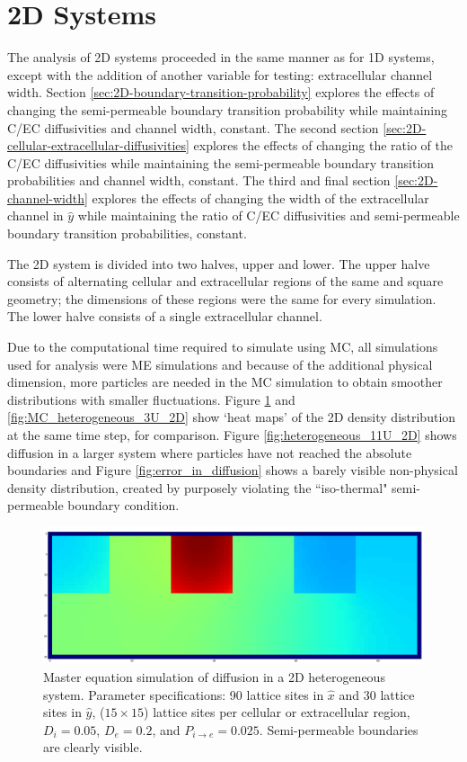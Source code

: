 \section{2D Systems}
\label{sec:ra-2D}
	The analysis of 2D systems proceeded in the same manner as for 1D systems, except with the addition of another variable for testing: extracellular channel width. Section \ref{sec:2D-boundary-transition-probability} explores the effects of changing the semi-permeable boundary transition probability while maintaining C/EC diffusivities and channel width, constant. The second section \ref{sec:2D-cellular-extracellular-diffusivities} explores the effects of changing the ratio of the C/EC diffusivities while maintaining the semi-permeable boundary transition probabilities and channel width, constant. The third and final section \ref{sec:2D-channel-width} explores the effects of changing the width of the extracellular channel in $ \hat{y} $ while maintaining the ratio of C/EC diffusivities and semi-permeable boundary transition probabilities, constant.
	
	The 2D system is divided into two halves, upper and lower. The upper halve consists of alternating cellular and extracellular regions of the same and square geometry; the dimensions of these regions were the same for every simulation. The lower halve consists of a single extracellular channel.
	
	Due to the computational time required to simulate using MC, all simulations used for analysis were ME simulations and because of the additional physical dimension, more particles are needed in the MC simulation to obtain smoother distributions with smaller fluctuations. Figure \ref{fig:heterogeneous_3U_2D} and \ref{fig:MC_heterogeneous_3U_2D} show `heat maps' of the 2D density distribution at the same time step, for comparison. Figure \ref{fig:heterogeneous_11U_2D} shows diffusion in a larger system where particles have not reached the absolute boundaries and Figure \ref{fig:error_in_diffusion} shows a barely visible non-physical density distribution, created by purposely violating the ``iso-thermal" semi-permeable boundary condition.
	
	\begin{figure}[h]
		\centering
		\includegraphics[width=1.0\linewidth]{../images/2D/heterogeneous_3U_2D}
		\caption{Master equation simulation of diffusion in a 2D heterogeneous system. Parameter specifications: 90 lattice sites in $ \hat{x} $ and 30 lattice sites in $ \hat{y} $, ($ 15 \times 15 $) lattice sites per cellular or extracellular region, $ D_i = 0.05 $, $ D_e = 0.2 $, and $ P_{i\rightarrow e} = 0.025 $. Semi-permeable boundaries are clearly visible.}
		\label{fig:heterogeneous_3U_2D}
	\end{figure}
	
